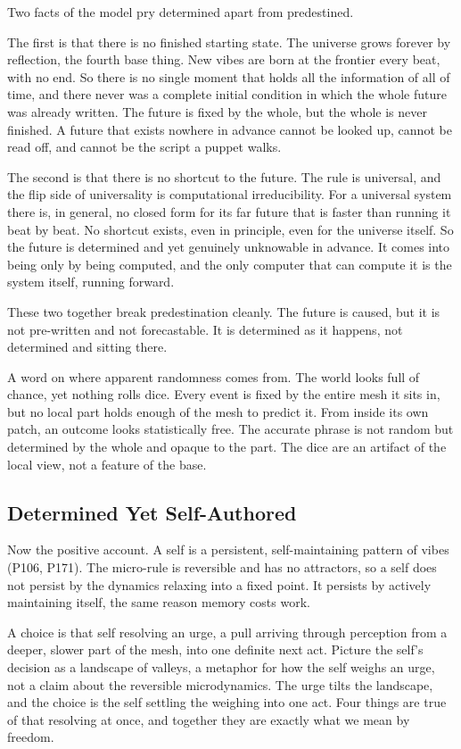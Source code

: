 Two facts of the model pry determined apart from predestined.

The first is that there is no finished starting state. The universe grows forever by reflection, the fourth base thing. New vibes are born at the frontier every beat, with no end. So there is no single moment that holds all the information of all of time, and there never was a complete initial condition in which the whole future was already written. The future is fixed by the whole, but the whole is never finished. A future that exists nowhere in advance cannot be looked up, cannot be read off, and cannot be the script a puppet walks.

The second is that there is no shortcut to the future. The rule is universal, and the flip side of universality is computational irreducibility. For a universal system there is, in general, no closed form for its far future that is faster than running it beat by beat. No shortcut exists, even in principle, even for the universe itself. So the future is determined and yet genuinely unknowable in advance. It comes into being only by being computed, and the only computer that can compute it is the system itself, running forward.

These two together break predestination cleanly. The future is caused, but it is not pre-written and not forecastable. It is determined as it happens, not determined and sitting there.

A word on where apparent randomness comes from. The world looks full of chance, yet nothing rolls dice. Every event is fixed by the entire mesh it sits in, but no local part holds enough of the mesh to predict it. From inside its own patch, an outcome looks statistically free. The accurate phrase is not random but determined by the whole and opaque to the part. The dice are an artifact of the local view, not a feature of the base.

\subsection{Determined Yet Self-Authored}

Now the positive account. A self is a persistent, self-maintaining pattern of vibes (P106, P171). The micro-rule is reversible and has no attractors, so a self does not persist by the dynamics relaxing into a fixed point. It persists by actively maintaining itself, the same reason memory costs work.

A choice is that self resolving an urge, a pull arriving through perception from a deeper, slower part of the mesh, into one definite next act. Picture the self's decision as a landscape of valleys, a metaphor for how the self weighs an urge, not a claim about the reversible microdynamics. The urge tilts the landscape, and the choice is the self settling the weighing into one act. Four things are true of that resolving at once, and together they are exactly what we mean by freedom.

